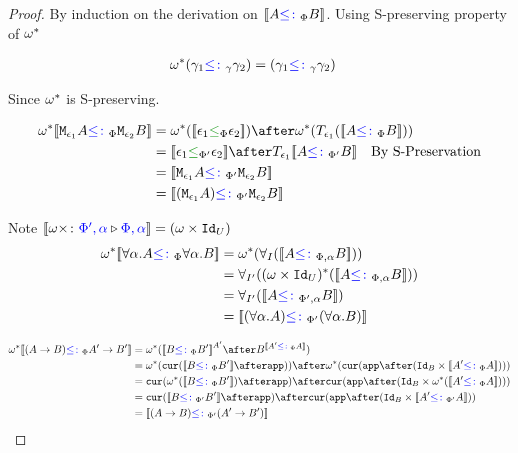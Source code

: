 \documentclass{report}
\begin{document}
\begin{framed}
    
    \begin{proof}
        
        By induction on the derivation on ${\bf [\![}A{\color{blue} \leq\colon}_\Phi B{\bf ]\!]}$. Using S-preserving property of $\omega^*$ 
        
        \case{\tground}
        \begin{align*}
            \omega^*(\gamma_1{\color{blue} \leq\colon}_\gamma\gamma_2) &= (\gamma_1{\color{blue} \leq\colon}_\gamma\gamma_2)
        \end{align*}
        
        Since $\omega^*$ is S-preserving.
        
        \case{\seffect}
        \begin{align*}
            \w\star\deno{\M{\e_1}{A} \subtypep \M{\e_2}{B}} & = \w\star(\deno{\e_1\subeffectp\e_2})\after\w\star(\T{\e_1}(\deno{A\subtypep B})) \\ 
             &= \deno{\e_1\subeffectpp\e_2} \after \T{\e_1}{\deno{A\subtypepp B}}\qt{By S-Preservation}\\
             &= \deno{\M{\e_1}{A}\subtypepp\M{\e_2}{B}}\\
             &= \deno{(\M{\e_1}{A})\subtypepp\M{\e_2}{B}}\\
        \end{align*}
        
        \case{\squant}
        Note ${\bf [\![}\omega\times \colon {\color{blue}\Phi',\alpha} \triangleright {\color {blue} \Phi,\alpha}{\bf ]\!]} = (\omega\times\texttt{Id}_{U})$
            \begin{align*}
                \w\star\deno{\all{\a}{A}\subtypep\all{\a}{B}} &= \w\star(\allI(\deno{A\subtypepa B})) \\
                &=\allII((\w\times\Id{U})\star(\deno{A\subtypepa B}))\\
                &=\allII(\deno{A\subtypeppa B})\\
                &= \deno{(\all{\a}{A}) \subtypepp(\all{\a}{B})}\\
            \end{align*}
        
        \case{\sfun}
        \begin{align*}
            \w\star\deno{(\ab)\subtypep\fntype{A'}{B'}} &= \w\star(\deno{B\subtypep B'}^{A'}\after B^{\deno{A'\subtypep A}})\\
            &= \w\star(\cur{\deno{B\subtypep B'}\after\app})\after\w\star(\cur{\app\after(\Id{B}\times\deno{A'\subtypep A})})\\
            & = \cur{\w\star(\deno{B\subtypep B'})\after\app}\after\cur{\app\after(\Id{B}\times\w\star(\deno{A'\subtypep A}))}\\
            & = \cur{\deno{B\subtypepp B'}\after\app}\after\cur{\app\after(\Id{B}\times\deno{A'\subtypepp A})}\\
            &= \deno{(\ab)\subtypepp(\fntype{A'}{B'})}
        \end{align*}
    \end{proof}
    
\end{framed}
\end{document}
